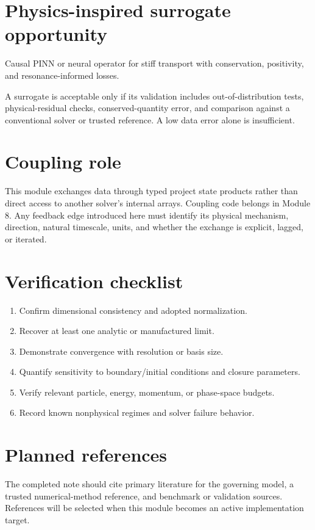 \documentclass[11pt]{article}
\begin{document}
\section{Physics-inspired surrogate opportunity}
Causal PINN or neural operator for stiff transport with conservation, positivity, and resonance-informed losses.

A surrogate is acceptable only if its validation includes out-of-distribution tests, physical-residual checks, conserved-quantity error, and comparison against a conventional solver or trusted reference. A low data error alone is insufficient.

\section{Coupling role}
This module exchanges data through typed project state products rather than direct access to another solver's internal arrays. Coupling code belongs in Module 8. Any feedback edge introduced here must identify its physical mechanism, direction, natural timescale, units, and whether the exchange is explicit, lagged, or iterated.

\section{Verification checklist}
\begin{enumerate}[leftmargin=1.6em]
\item Confirm dimensional consistency and adopted normalization.
\item Recover at least one analytic or manufactured limit.
\item Demonstrate convergence with resolution or basis size.
\item Quantify sensitivity to boundary/initial conditions and closure parameters.
\item Verify relevant particle, energy, momentum, or phase-space budgets.
\item Record known nonphysical regimes and solver failure behavior.
\end{enumerate}

\section{Planned references}
The completed note should cite primary literature for the governing model, a trusted numerical-method reference, and benchmark or validation sources. References will be selected when this module becomes an active implementation target.
\end{document}
